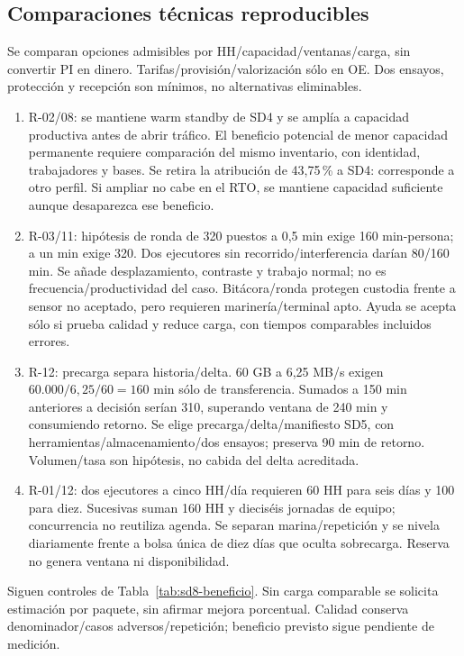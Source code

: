 \subsection{Comparaciones técnicas reproducibles}\label{sec:sd8-comparacion-p06}
Se comparan opciones admisibles por HH/capacidad/ventanas/carga, sin convertir PI en dinero. Tarifas/provisión/valorización sólo en OE. Dos ensayos, protección y recepción son mínimos, no alternativas eliminables. \parencites[8.3]{sd8-ex}[art.~50.2; p.~29]{sd8-ba}
\begin{enumerate}
\item R-02/08: se mantiene warm standby de SD4 y se amplía a capacidad productiva antes de abrir tráfico. El beneficio potencial de menor capacidad permanente requiere comparación del mismo inventario, con identidad, trabajadores y bases. Se retira la atribución de 43,75\,\% a SD4: corresponde a otro perfil. Si ampliar no cabe en el RTO, se mantiene capacidad suficiente aunque desaparezca ese beneficio.
\item R-03/11: hipótesis de ronda de 320 puestos a 0,5 min exige 160 min-persona; a un min exige 320. Dos ejecutores sin recorrido/interferencia darían 80/160 min. Se añade desplazamiento, contraste y trabajo normal; no es frecuencia/productividad del caso. Bitácora/ronda protegen custodia frente a sensor no aceptado, pero requieren marinería/terminal apto. Ayuda se acepta sólo si prueba calidad y reduce carga, con tiempos comparables incluidos errores.
\item R-12: precarga separa historia/delta. 60 GB a 6,25 MB/s exigen $60.000/6{,}25/60=160$ min sólo de transferencia. Sumados a 150 min anteriores a decisión serían 310, superando ventana de 240 min y consumiendo retorno. Se elige precarga/delta/manifiesto SD5, con herramientas/almacenamiento/dos ensayos; preserva 90 min de retorno. Volumen/tasa son hipótesis, no cabida del delta acreditada.
\item R-01/12: dos ejecutores a cinco HH/día requieren 60 HH para seis días y 100 para diez. Sucesivas suman 160 HH y dieciséis jornadas de equipo; concurrencia no reutiliza agenda. Se separan marina/repetición y se nivela diariamente frente a bolsa única de diez días que oculta sobrecarga. Reserva no genera ventana ni disponibilidad.
\end{enumerate}
Siguen controles de Tabla~\ref{tab:sd8-beneficio}. Sin carga comparable se solicita estimación por paquete, sin afirmar mejora porcentual. Calidad conserva denominador/casos adversos/repetición; beneficio previsto sigue pendiente de medición.

